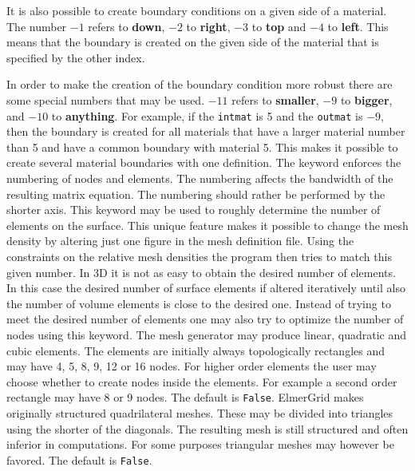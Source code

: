 It is also possible to create boundary conditions on a 
given side of a material. The number $-1$ refers to \textbf{down},
$-2$ to \textbf{right}, $-3$ to \textbf{top} and $-4$ to \textbf{left}. 
This means that the boundary is created on the given side 
of the material that is specified by the other index.

In order to make the creation of the boundary condition
more robust there are some special numbers that may be used.
$-11$ refers to \textbf{smaller}, $-9$ to \textbf{bigger}, 
and $-10$ to \textbf{anything}. For example, if the 
\texttt{intmat} is 5 and the \texttt{outmat} is $-9$, then
the boundary is created for all materials that have a larger
material number than 5 and have a common boundary with 
material 5. This makes it possible to create several 
material boundaries with one definition.
%
The keyword enforces the numbering of nodes and elements.
The numbering affects the 
bandwidth of the resulting matrix equation.
The numbering should rather be performed by the shorter axis.
%
This keyword may be used to roughly determine the number
of elements on the surface. This unique feature makes it possible to
change the mesh density by altering just one figure in the
mesh definition file.
Using the constraints on the relative mesh densities 
the program then tries to match this given number.  
%
In 3D it is not as easy to obtain the desired 
number of elements. In this case the desired number of surface elements
if altered iteratively until also the number of volume elements is close to the
desired one.
%
Instead of trying to meet the desired number of elements one may also 
try to optimize the number of nodes using this keyword.
%
The mesh generator may produce linear, quadratic and 
cubic elements. 
The elements are initially always topologically rectangles and
may have 4, 5, 8, 9, 12 or 16 nodes. 
%
For higher order elements the user may choose whether to
create nodes inside the elements. For example a second order rectangle 
may have 8 or 9 nodes. The default is \texttt{False}.
%
ElmerGrid makes originally structured quadrilateral meshes.
These may be divided into triangles 
using the shorter of the diagonals.
The resulting mesh is still structured and
often inferior in computations. For some purposes triangular meshes 
may however be favored. The default is \texttt{False}.

